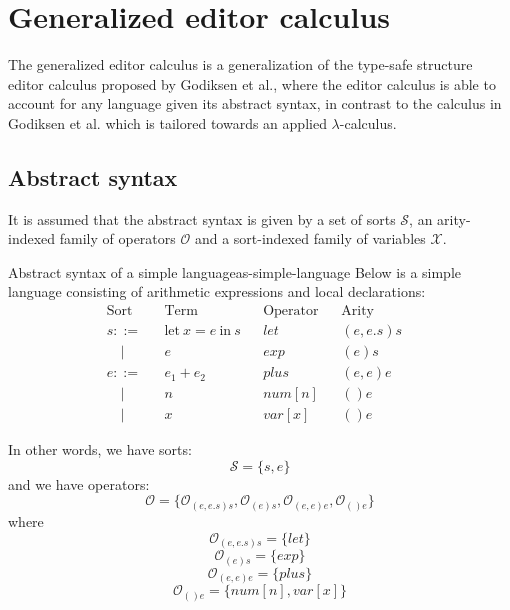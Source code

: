 \section{Generalized editor calculus}
The generalized editor calculus\cite{aalborg} is a generalization of the type-safe structure editor calculus proposed by Godiksen et al.\cite{godiksen}, where the editor calculus is able to account for any language given its abstract syntax, in contrast to the calculus in Godiksen et al. which is tailored towards an applied $\lambda$-calculus.

\subsection{Abstract syntax}
It is assumed that the abstract syntax is given by a set of sorts $\mathcal{S}$, an arity-indexed family of operators $\mathcal{O}$ and a sort-indexed family of variables $\mathcal{X}$.

\begin{example}{Abstract syntax of a simple language}{as-simple-language}
    Below is a simple language consisting of arithmetic expressions and local declarations:
    \[
        \begin{aligned}
             & \text{Sort} &  & \text{Term}                        &  & \text{Operator} &  & \text{Arity} &  & \\
             & s ::=       &  & \text{let} \ x = e \ \text{in} \ s &  & let             &  & (e,e.s)s     &  & \\
             & \quad |     &  & e                                  &  & exp             &  & (e)s         &  & \\
             & e ::=       &  & e_1 + e_2                          &  & plus            &  & (e,e)e       &  & \\
             & \quad |     &  & n                                  &  & num[n]          &  & ()e          &  & \\
             & \quad |     &  & x                                  &  & var[x]          &  & ()e
        \end{aligned}
    \]

    In other words, we have sorts: $$\mathcal{S} = \{ s, e \}$$ and we have operators: $$\mathcal{O} = \{
        \mathcal{O}_{(e,e.s)s}, \mathcal{O}_{(e)s}, \mathcal{O}_{(e,e)e}, \mathcal{O}_{()e}\}$$ where $$\mathcal{O}_{(e,e.s)s} = \{ let \}$$ $$\mathcal{O}_{(e)s} = \{ exp \}$$ $$\mathcal{O}_{(e,e)e} = \{ plus \}$$ $$\mathcal{O}_{()e} = \{ num[n], var[x] \}$$

\end{example}

